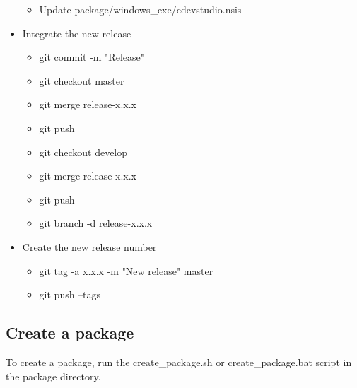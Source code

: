 \documentclass{article}
\begin{document}
\begin{itemize}
\begin{itemize}
		\item Update package/windows_exe/cdevstudio.nsis
	\end{itemize}
	\item Integrate the new release
	\begin{itemize}
		\item git commit -m "Release"
		\item git checkout master
		\item git merge release-x.x.x
		\item git push
		\item git checkout develop
		\item git merge release-x.x.x
		\item git push
		\item git branch -d release-x.x.x
	\end{itemize}
	\item Create the new release number
	\begin{itemize}
		\item git tag -a x.x.x -m "New release" master
		\item git push --tags
	\end{itemize}
\end{itemize}

\subsection{Create a package}
To create a package, run the create_package.sh or create_package.bat script in the package directory.
\end{document}
